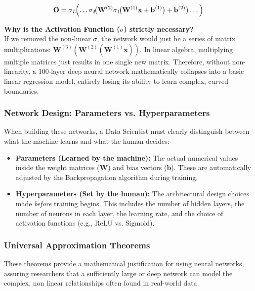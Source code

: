 \documentclass[11pt]{article}
\theoremstyle{smallexample}
\begin{document}
\begin{equation}
    \mathbf{O} = \sigma_L\!\Bigl(\dots \sigma_2\!\bigl(\mathbf{W}^{(2)}\sigma_1\!\bigl(\mathbf{W}^{(1)}\mathbf{x} + \mathbf{b}^{(1)}\bigr) + \mathbf{b}^{(2)}\bigr)\dots\Bigr)
\end{equation}

\textbf{Why is the Activation Function ($\sigma$) strictly necessary?} \\
If we removed the non-linear $\sigma$, the network would just be a series of matrix multiplications: $\mathbf{W}^{(3)}(\mathbf{W}^{(2)}(\mathbf{W}^{(1)}\mathbf{x}))$. In linear algebra, multiplying multiple matrices just results in one single new matrix. Therefore, without non-linearity, a 100-layer deep neural network mathematically collapses into a basic linear regression model, entirely losing its ability to learn complex, curved boundaries.

\subsubsection{Network Design: Parameters vs. Hyperparameters}
When building these networks, a Data Scientist must clearly distinguish between what the machine learns and what the human decides:

\begin{itemize}
    \item \textbf{Parameters (Learned by the machine):} The actual numerical values inside the weight matrices ($\mathbf{W}$) and bias vectors ($\mathbf{b}$). These are automatically adjusted by the Backpropagation algorithm during training.
    \item \textbf{Hyperparameters (Set by the human):} The architectural design choices made \textit{before} training begins. This includes the number of hidden layers, the number of neurons in each layer, the learning rate, and the choice of activation functions (e.g., ReLU vs. Sigmoid).
\end{itemize}






\subsubsection{Universal Approximation Theorems}

These theorems provide a mathematical justification for using neural networks, assuring researchers that a sufficiently large or deep network can model the complex, non linear relationships often found in real-world data. 
\end{document}
